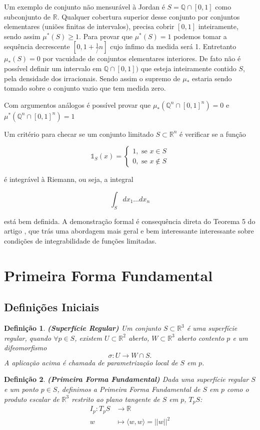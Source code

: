 \documentclass[12pt,letterpaper]{article}
\newtheorem{defi}{Definição}
\newcommand{\real}{\mathbb{R}}
\newcommand{\one}{\mathds{1}}
\newcommand{\rr}{\mathbb{R}^2}
\newcommand{\rn}{\mathbb{R}^n}
\newcommand{\Int}{\displaystyle\int}
\begin{document}
	Um exemplo de conjunto não mensurável à Jordan é $S=\mathbb{Q}\cap[0,1]$ como subconjunto de $\real$.
	Qualquer cobertura superior desse conjunto por conjuntos elementares (uniões finitas de intervalos), precisa cobrir $[0,1]$ inteiramente, sendo assim $\mu^{*}(S)\geq1$. Para provar que $\mu^{*}(S)=1$ podemos tomar a sequência decrescente $[0,1+\frac1/n]$ cujo ínfimo da medida será 1.
	Entretanto $\mu_{*}(S)=0$ por vacuidade de conjuntos elementares interiores. De fato não é possível definir um intervalo em $\mathbb{Q}\cap[0,1])$ que esteja inteiramente contido $S$, pela densidade dos irracionais. Sendo assim o supremo de $\mu_{*}$ estaria sendo tomado sobre o conjunto vazio que tem medida zero.
	
	Com argumentos análogos é possível provar que $\mu_{*}(\mathbb{Q}^n\cap[0,1]^n)=0$ e $\mu^{*}(\mathbb{Q}^n\cap[0,1]^n)=1$
	
	Um critério para checar se um conjunto limitado $S\subset \rn$ é verificar se a função 
	
	$$\one_S(x)=\begin{cases}1,\text{ se }x\in S\\0,\text{ se }x \notin S\end{cases}$$
	
	é integrável à Riemann, ou seja, a integral 
	
	$$\Int_Sdx_1\ldots dx_n$$
	
	está bem definida. A demonstração formal é consequência direta do Teorema 5 do artigo \cite{frink}, que trás uma abordagem mais geral e bem interessante interessante sobre condições de integrabilidade de funções limitadas.  
	
	
\section{Primeira Forma Fundamental}
	\label{fff}
	\subsection{Definições Iniciais}
	\begin{defi}
		 \textbf{(Superfície Regular)\cite{ronaldo}} Um conjunto $S\subset\real^3$ é uma superfície regular, quando $\forall p\in S$, existem $U\subset\rr$ aberto, $W\subset\real^3$ aberto contento $p$ e um difeomorfismo 
		$$\sigma:U\to W\cap S.$$
	A aplicação acima é chamada de parametrização local de $S$ em $p$.
	\end{defi}
	
	\begin{defi}
		\textbf{(Primeira Forma Fundamental)\cite{ronaldo}} Dada uma superfície regular $S$ e um ponto $p\in S$, definimos a Primeira Forma Fundamental de $S$ em $p$ como o produto escalar de $\real^3$ restrito ao plano tangente de $S$ em $p$, $T_pS$:
		\begin{align*}
			I_p:T_pS&\to\real\\
			w&\mapsto \langle w,w\rangle=||w||^2
		\end{align*}
	\end{defi}
\end{document}
